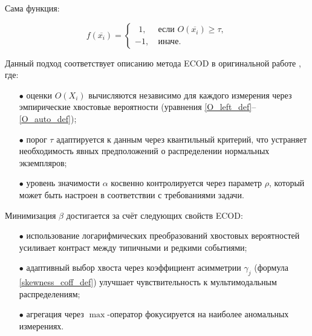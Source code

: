 \newpage
Сама функция:

\begin{equation}\label{f_ecod_def}
    f(\overline{x_i}) = \begin{cases}
         \ \ 1, &\ \text{если } O(\overline{x_i}) \geq \tau, \\
         -1, &\ \text{иначе}. 
    \end{cases}
\end{equation}

Данный подход соответствует описанию метода ECOD в оригинальной работе \cite{ECOD}, где:
\begin{itemize}[leftmargin=0pt,itemindent=4.6em]
    \item[$\bullet$] оценки $O(X_i)$ вычисляются независимо для каждого измерения через эмпирические хвостовые вероятности (уравнения \ref{O_left_def}--\ref{O_auto_def});
    \item[$\bullet$] порог $\tau$ адаптируется к данным через квантильный критерий, что устраняет необходимость явных предположений о распределении нормальных экземпляров;
    \item[$\bullet$] уровень значимости $\alpha$ косвенно контролируется через параметр $\rho$, который может быть настроен в соответствии с требованиями задачи.
\end{itemize}

Минимизация $\beta$ достигается за счёт следующих свойств ECOD:
\begin{itemize}[leftmargin=0pt,itemindent=4.6em]
    \item[$\bullet$] использование логарифмических преобразований хвостовых вероятностей усиливает контраст между типичными и редкими событиями;
    \item[$\bullet$] адаптивный выбор хвоста через коэффициент асимметрии $\gamma_j$ (формула \ref{skewness_coff_def}) улучшает чувствительность к мультимодальным распределениям;
    \item[$\bullet$] агрегация через $\max$-оператор фокусируется на наиболее аномальных измерениях.
\end{itemize}





